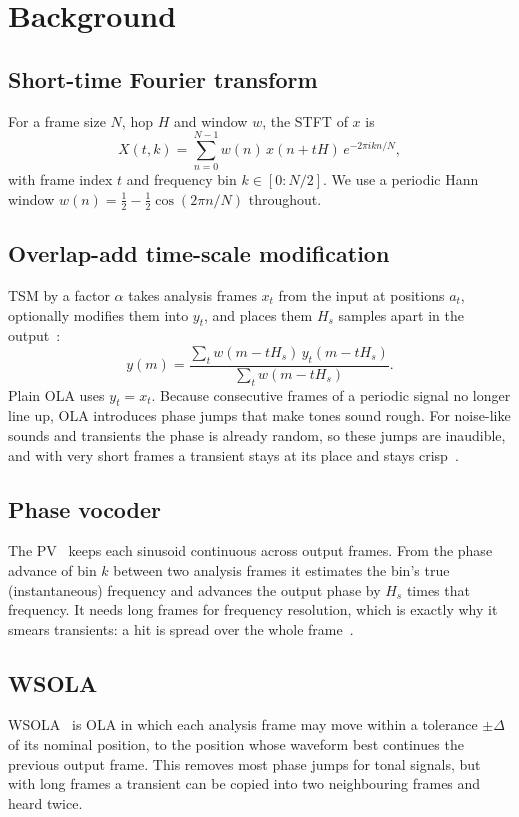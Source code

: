 \documentclass[conference]{IEEEtran}
\begin{document}
\section{Background}
\label{sec:background}

\subsection{Short-time Fourier transform}
For a frame size $N$, hop $H$ and window $w$, the STFT of $x$ is
\begin{equation}
X(t,k)=\sum_{n=0}^{N-1} w(n)\,x(n+tH)\,e^{-2\pi i kn/N},
\label{eq:stft}
\end{equation}
with frame index $t$ and frequency bin $k\in[0:N/2]$. We use a periodic Hann window $w(n)=\tfrac12-\tfrac12\cos(2\pi n/N)$ throughout.

\subsection{Overlap-add time-scale modification}
TSM by a factor $\alpha$ takes analysis frames $x_t$ from the input at positions $a_t$, optionally modifies them into $y_t$, and places them $H_s$ samples apart in the output~\cite{driedger14}:
\begin{equation}
y(m)=\frac{\sum_t w(m-tH_s)\,y_t(m-tH_s)}{\sum_t w(m-tH_s)}.
\label{eq:ola}
\end{equation}
Plain OLA uses $y_t=x_t$. Because consecutive frames of a periodic signal no longer line up, OLA introduces phase jumps that make tones sound rough. For noise-like sounds and transients the phase is already random, so these jumps are inaudible, and with very short frames a transient stays at its place and stays crisp~\cite{driedger14}.

\subsection{Phase vocoder}
The PV~\cite{flanagan66} keeps each sinusoid continuous across output frames. From the phase advance of bin $k$ between two analysis frames it estimates the bin's true (instantaneous) frequency and advances the output phase by $H_s$ times that frequency. It needs long frames for frequency resolution, which is exactly why it smears transients: a hit is spread over the whole frame~\cite{laroche99}.

\subsection{WSOLA}
WSOLA~\cite{verhelst93} is OLA in which each analysis frame may move within a tolerance $\pm\Delta$ of its nominal position, to the position whose waveform best continues the previous output frame. This removes most phase jumps for tonal signals, but with long frames a transient can be copied into two neighbouring frames and heard twice.
\end{document}
